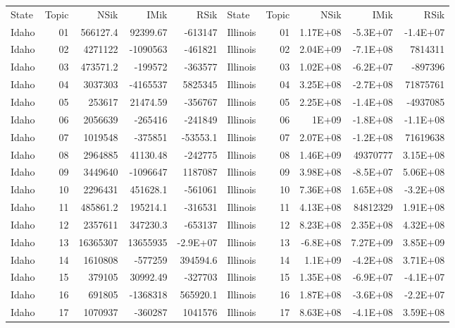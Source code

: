 \begin{table}[]
	\footnotesize
	\begin{tabular}{lrrrrlrrrr}
			State & Topic & NSik & IMik & RSik & State & Topic & NSik & IMik & RSik \\
		Idaho &  01  & 566127.4 & 92399.67 & -613147 & Illinois &  01  & 1.17E+08 & -5.3E+07 & -1.4E+07 \\
		Idaho &  02  & 4271122 & -1090563 & -461821 & Illinois &  02  & 2.04E+09 & -7.1E+08 & 7814311 \\
		Idaho &  03  & 473571.2 & -199572 & -363577 & Illinois &  03  & 1.02E+08 & -6.2E+07 & -897396 \\
		Idaho &  04  & 3037303 & -4165537 & 5825345 & Illinois &  04  & 3.25E+08 & -2.7E+08 & 71875761 \\
		Idaho &  05  & 253617 & 21474.59 & -356767 & Illinois &  05  & 2.25E+08 & -1.4E+08 & -4937085 \\
		Idaho &  06  & 2056639 & -265416 & -241849 & Illinois &  06  & 1E+09 & -1.8E+08 & -1.1E+08 \\
		Idaho &  07  & 1019548 & -375851 & -53553.1 & Illinois &  07  & 2.07E+08 & -1.2E+08 & 71619638 \\
		Idaho &  08  & 2964885 & 41130.48 & -242775 & Illinois &  08  & 1.46E+09 & 49370777 & 3.15E+08 \\
		Idaho &  09  & 3449640 & -1096647 & 1187087 & Illinois &  09  & 3.98E+08 & -8.5E+07 & 5.06E+08 \\
		Idaho &  10 & 2296431 & 451628.1 & -561061 & Illinois &  10 & 7.36E+08 & 1.65E+08 & -3.2E+08 \\
		Idaho &  11 & 485861.2 & 195214.1 & -316531 & Illinois &  11 & 4.13E+08 & 84812329 & 1.91E+08 \\
		Idaho &  12 & 2357611 & 347230.3 & -653137 & Illinois &  12 & 8.23E+08 & 2.35E+08 & 4.32E+08 \\
		Idaho &  13 & 16365307 & 13655935 & -2.9E+07 & Illinois &  13 & -6.8E+08 & 7.27E+09 & 3.85E+09 \\
		Idaho &  14 & 1610808 & -577259 & 394594.6 & Illinois &  14 & 1.1E+09 & -4.2E+08 & 3.71E+08 \\
		Idaho &  15 & 379105 & 30992.49 & -327703 & Illinois &  15 & 1.35E+08 & -6.9E+07 & -4.1E+07 \\
		Idaho &  16 & 691805 & -1368318 & 565920.1 & Illinois &  16 & 1.87E+08 & -3.6E+08 & -2.2E+07 \\
		Idaho &  17 & 1070937 & -360287 & 1041576 & Illinois &  17 & 8.63E+08 & -4.1E+08 & 3.59E+08 \\

\end{tabular}
\end{table}
